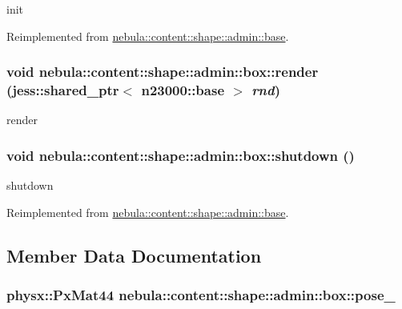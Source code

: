 init 

Reimplemented from \hyperlink{classnebula_1_1content_1_1shape_1_1admin_1_1base_ae02304c56a4c72ac3b845e71289f450b}{nebula::content::shape::admin::base}.\hypertarget{classnebula_1_1content_1_1shape_1_1admin_1_1box_aee3c2f7f91c2d99ef1ea80b97dd5d04d}{
\subsubsection[{render}]{\setlength{\rightskip}{0pt plus 5cm}void nebula::content::shape::admin::box::render (jess::shared\_\-ptr$<$ {\bf n23000::base} $>$ {\em rnd})}}
\label{classnebula_1_1content_1_1shape_1_1admin_1_1box_aee3c2f7f91c2d99ef1ea80b97dd5d04d}


render \hypertarget{classnebula_1_1content_1_1shape_1_1admin_1_1box_a498fc0508fcdfc64a7e80141f623505d}{
\subsubsection[{shutdown}]{\setlength{\rightskip}{0pt plus 5cm}void nebula::content::shape::admin::box::shutdown ()}}
\label{classnebula_1_1content_1_1shape_1_1admin_1_1box_a498fc0508fcdfc64a7e80141f623505d}


shutdown 

Reimplemented from \hyperlink{classnebula_1_1content_1_1shape_1_1admin_1_1base_a61d6e9d7853ccf10ddd3d05311729f79}{nebula::content::shape::admin::base}.

\subsection{Member Data Documentation}
\hypertarget{classnebula_1_1content_1_1shape_1_1admin_1_1box_a6365e7e95570a051c89eb187e1442c55}{
\subsubsection[{pose\_\-}]{\setlength{\rightskip}{0pt plus 5cm}physx::PxMat44 {\bf nebula::content::shape::admin::box::pose\_\-}}}
\label{classnebula_1_1content_1_1shape_1_1admin_1_1box_a6365e7e95570a051c89eb187e1442c55}


